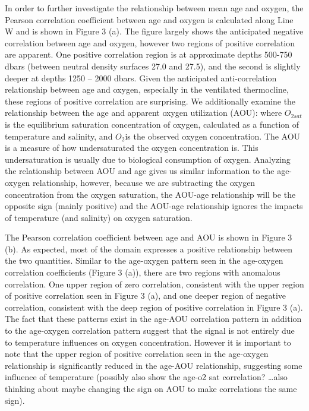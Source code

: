 In order to further investigate the relationship between mean age and oxygen, the Pearson correlation coefficient between age and oxygen is calculated along Line W and is shown in Figure 3 (a).  The figure largely shows the anticipated negative correlation between age and oxygen, however two regions of positive correlation are apparent. One positive correlation region is at approximate depths 500-750 dbars (between neutral density surfaces 27.0 and 27.5), and the second is slightly deeper at depths 1250 – 2000 dbars. Given the anticipated anti-correlation relationship between age and oxygen, especially in the ventilated thermocline, these regions of positive correlation are surprising. We additionally examine the relationship between the age and apparent oxygen utilization (AOU):
where $O_{2 sat}$ is the equilibrium saturation concentration of oxygen, calculated as a function of temperature and salinity, and $O_2$is the observed oxygen concentration. The AOU is a measure of how undersaturated the oxygen concentration is. This undersaturation is usually due to biological consumption of oxygen. Analyzing the relationship between AOU and age gives us similar information to the age-oxygen relationship, however, because we are subtracting the oxygen concentration from the oxygen saturation, the AOU-age relationship will be the opposite sign (mainly positive) and the AOU-age relationship ignores the impacts of temperature (and salinity) on oxygen saturation.

The Pearson correlation coefficient between age and AOU is shown in Figure 3 (b). As expected, most of the domain expresses a positive relationship between the two quantities. Similar to the age-oxygen pattern seen in the age-oxygen correlation coefficients (Figure 3 (a)), there are two regions with anomalous correlation. One upper region of zero correlation, consistent with the upper region of  positive correlation seen in Figure 3 (a), and one deeper region of negative correlation, consistent with the deep region of positive correlation in Figure 3 (a). The fact that these patterns exist in the age-AOU correlation pattern in addition to the age-oxygen correlation pattern suggest that the signal is not entirely due to temperature influences on oxygen concentration. However it is important to note that the upper region of positive correlation seen in the age-oxygen relationship is significantly reduced in the age-AOU relationship, suggesting some influence of temperature (possibly also show the age-o2 sat correlation? \ldots also thinking about maybe changing the sign on AOU to make correlations the same sign).

